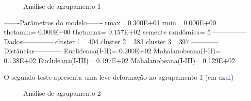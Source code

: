 \begin{figure}[H]
	\centering
	\setlength{\fboxsep}{8pt}
	\setlength{\fboxrule}{0.1pt}
	\caption{Análise de agrupamento 1}
	\label{AC1}
\end{figure}

 -------Parâmetros do modelo-------
 rmax=     0.300E+01
 rmin=     0.000E+00
 thetamin=     0.000E+00
 thetamax=     0.157E+02
 semente randômica=           5
 ---------------Dados--------------
 cluster 1=         404
 cluster 2=         383
 cluster 3=         397
 ------------Distâncias------------
 Euclideana(I-II)=     0.200E+02
 Mahalanobeana(I-II)=     0.138E+02
 Euclideana(I-III)=     0.197E+02
 Mahalanobeana(I-III)=     0.129E+02


O segundo teste apresenta uma leve deformação no agrupamento 1 (em \textcolor{blue}{azul})

\begin{figure}[H]
	\centering
	\setlength{\fboxsep}{8pt}
	\setlength{\fboxrule}{0.1pt}
	\caption{Análise de agrupamento 2}
	\label{AC2}
\end{figure}

